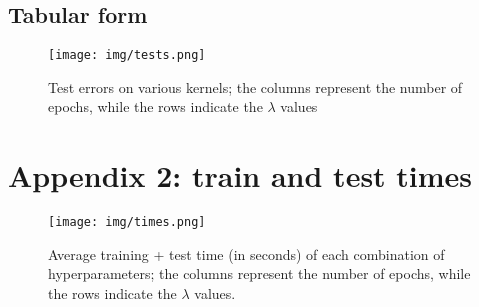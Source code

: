 \documentclass[a4paper]{article}
\begin{document}
\clearpage

\subsection{Tabular form}
\label{sec:org2d21260}

\begin{figure}[htbp]
\centering
\texttt{[image: img/tests.png]}
\caption[Short caption]{Test errors on various kernels; the columns represent the number of epochs, while the rows indicate the \(\lambda\) values}
\end{figure}

\section{Appendix 2: train and test times}
\label{sec:org05ee95e}
\label{org4d67df6}

\begin{figure}[htbp]
\centering
\texttt{[image: img/times.png]}
\caption[Short caption]{Average training + test time (in seconds) of each combination of hyperparameters; the columns represent the number of epochs, while the rows indicate the \(\lambda\) values.}
\end{figure}

\vfill
\clearpage
\end{document}
